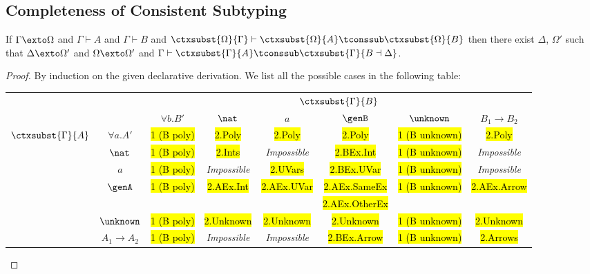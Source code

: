 \subsection{Completeness of Consistent Subtyping}

\begin{mtheorem}  \label{thm:sub_completeness}%
  If $\Gamma \exto \Omega$ and $\Gamma \vdash A$ and $\Gamma \vdash B$ and
  $\ctxsubst{\Omega}{\Gamma} \vdash \ctxsubst{\Omega}{A} \tconssub
  \ctxsubst{\Omega}{B}$ then there exist $\Delta$, $\Omega'$ such that $\Delta
  \exto \Omega'$ and $\Omega \exto \Omega'$ and $\Gamma \vdash
  \ctxsubst{\Gamma}{A} \tconssub \ctxsubst{\Gamma}{B \dashv \Delta}$.
\end{mtheorem}
\begin{proof}
  By induction on the given declarative derivation. We list all the possible cases in the following table:

  \begin{center}
\begin{footnotesize}
\begin{tabular}{cccccccc} \toprule
&                 & \multicolumn{6}{c}{ $\ctxsubst{\Gamma}{B}$  }  \\
&                 & $\forall b. B'$  & $\nat$      & $a$         & $\genB$     & $\unknown$          & $B_1 \to B_2$ \\ \cmidrule{3-8}
   \multirow{6}{*}{$\ctxsubst{\Gamma}{A}$} & $\forall a. A'$ & \hl{1 (B poly)}  & \hl{2.Poly} & \hl{2.Poly} & \hl{2.Poly} & \hl{1 (B unknown)}         &  \hl{2.Poly}  \\ \cmidrule{3-8}
& $\nat$          & \hl{1 (B poly)}  &  \hl{2.Ints}           &  \textit{Impossible} & \hl{2.BEx.Int}            & \hl{1 (B unknown)}  &  \textit{Impossible}  \\ \cmidrule{3-8}
& $a$             &  \hl{1 (B poly)} & \textit{Impossible} &  \hl{2.UVars}           &  \hl{2.BEx.UVar}           &  \hl{1 (B unknown)} &  \textit{Impossible}  \\ \cmidrule{3-8}
& \multirow{2}{*}{$\genA$}         & \multirow{2}{*}{\hl{1 (B poly)}}   & \multirow{2}{*}{\hl{2.AEx.Int}} & \multirow{2}{*}{\hl{2.AEx.UVar}} & \hl{2.AEx.SameEx}  & \multirow{2}{*}{\hl{1 (B unknown)}}  & \multirow{2}{*}{\hl{2.AEx.Arrow}} \\
& & & & & \hl{2.AEx.OtherEx} &   &   \\ \cmidrule{3-8}
& $\unknown$      & \hl{1 (B poly)}  & \hl{2.Unknown} &  \hl{2.Unknown}  &  \hl{2.Unknown} & \hl{1 (B unknown)}  & \hl{2.Unknown} \\ \cmidrule{3-8}
  & $A_1 \to A_2$     & \hl{1 (B poly)}  & \textit{Impossible} &  \textit{Impossible}  & \hl{2.BEx.Arrow}  & \hl{1 (B unknown)}  & \hl{2.Arrows} \\ \bottomrule
\end{tabular}
\end{footnotesize}
  \end{center}


\end{proof}
